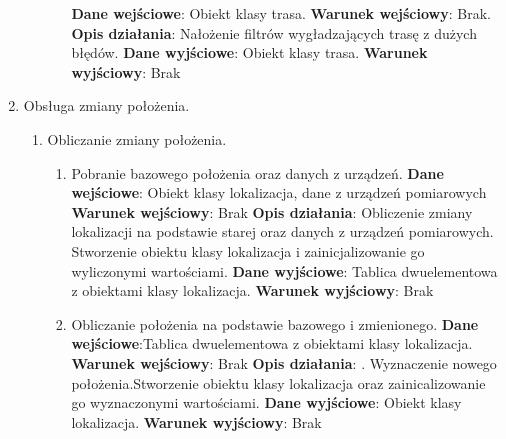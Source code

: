 \documentclass[11pt]{article}
\begin{document}
\begin{enumerate}
\begin{enumerate}[label*=\arabic*.]
\begin{enumerate}[label*=\arabic*.]
				\textbf{Dane wejściowe}: Obiekt klasy trasa.	\newline
				\textbf{Warunek wejściowy}: Brak.	\newline   	
				\textbf{Opis działania}: Nałożenie filtrów wygładzających trasę z dużych błędów.	\newline
				\textbf{Dane wyjściowe}: Obiekt klasy trasa.	\newline
				\textbf{Warunek wyjściowy}: Brak
			\end{enumerate}
		\end{enumerate}
		\item Obsługa zmiany położenia.
		\begin{enumerate}[label*=\arabic*.]
			\item Obliczanie zmiany położenia.
			\begin{enumerate}[label*=\arabic*.]
				\item Pobranie bazowego położenia oraz danych z urządzeń. \newline
				\textbf{Dane wejściowe}: Obiekt klasy lokalizacja, dane z urządzeń pomiarowych	\newline
				\textbf{Warunek wejściowy}: Brak		\newline   	
				\textbf{Opis działania}: \newline Obliczenie zmiany lokalizacji na podstawie starej oraz danych z urządzeń pomiarowych. \newline Stworzenie obiektu klasy lokalizacja i zainicjalizowanie go wyliczonymi wartościami.	\newline
				\textbf{Dane wyjściowe}: Tablica dwuelementowa z obiektami klasy lokalizacja.	\newline
				\textbf{Warunek wyjściowy}: Brak
				\item Obliczanie położenia na podstawie bazowego i zmienionego. \newline
				\textbf{Dane wejściowe}:Tablica dwuelementowa z obiektami klasy lokalizacja.	\newline
				\textbf{Warunek wejściowy}: Brak		\newline   	
				\textbf{Opis działania}: .	\newline Wyznaczenie nowego położenia.\newline Stworzenie obiektu klasy lokalizacja oraz zainicalizowanie go wyznaczonymi wartościami. \newline
				\textbf{Dane wyjściowe}: Obiekt klasy lokalizacja.	\newline
				\textbf{Warunek wyjściowy}: Brak
			\end{enumerate}
		\end{enumerate}
	\end{enumerate}
	\newpage
	
\end{document}
